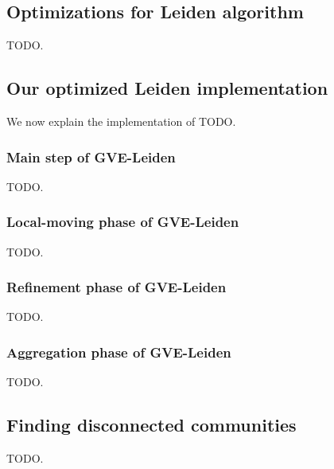 \subsection{Optimizations for Leiden algorithm}
\label{sec:leiden}

TODO.

% 
% 
% 




\subsection{Our optimized Leiden implementation}

We now explain the implementation of TODO.


\subsubsection{Main step of GVE-Leiden}

TODO.

% 
% 
% 
% 


\subsubsection{Local-moving phase of GVE-Leiden}

TODO.


\subsubsection{Refinement phase of GVE-Leiden}

TODO.


\subsubsection{Aggregation phase of GVE-Leiden}

TODO.




\subsection{Finding disconnected communities}

TODO.
